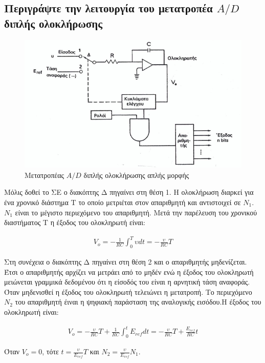 \documentclass{article}
\begin{document}
\subsection{Περιγράψτε την λειτουργία του μετατροπέα $A/D$ διπλής 
ολοκλήρωσης}

\begin{figure}[h!]
    \includegraphics[width=\linewidth]{AD2olok.png}
    \caption{Μετατροπέας $A/D$ διπλής ολοκλήρωσης απλής μορφής}
\end{figure}
Μόλις δοθεί το ΣΕ ο διακόπτης Δ πηγαίνει στη θέση 1. Η ολοκλήρωση διαρκεί για ένα χρονικό διάστημα Τ το οποίο μετριέται στον απαριθμητή και αντιστοιχεί σε $Ν_1$. $Ν_1$ είναι το μέγιστο 
περιεχόμενο του απαριθμητή. Μετά την παρέλευση του χρονικού διαστήματος Τ η έξοδος του ολοκληρωτή είναι: 

\begin{align*}
    V_o=-\frac{1}{RC}\int^{T}_{0} \upsilon dt=-\frac{\upsilon}{RC}T
\end{align*}

Στη συνέχεια ο διακόπτης Δ πηγαίνει στη θέση 2 και ο απαριθμητής μηδενίζεται. Έτσι ο απαριθμητής αρχίζει να μετράει από το μηδέν ενώ η έξοδος του ολοκληρωτή μειώνεται γραμμικά δεδομένου
ότι η είσοδός του είναι η αρνητική τάση αναφοράς. Όταν μηδενισθεί η έξοδος του ολοκληρωτή τελειώνει η μετατροπή. Το περιεχόμενο $Ν_2$ του απαριθμητή έιναι η ψηφιακή παράσταση της 
αναλογικής εισόδου.Η έξοδος του ολοκληρωτή είναι: 

\begin{align*}
    V_o = -\frac{\upsilon}{RC}T + \frac{1}{RC} \int^t_0 E_{ref}dt = - \frac{\upsilon}{RC}T + \frac{E_{ref}}{RC}t
\end{align*}

Όταν $V_o = 0$, τότε $t=\frac{\upsilon}{E_{ref}}T$ και $N_2=\frac{\upsilon}{E_{ref}}N_1$.
\end{document}
